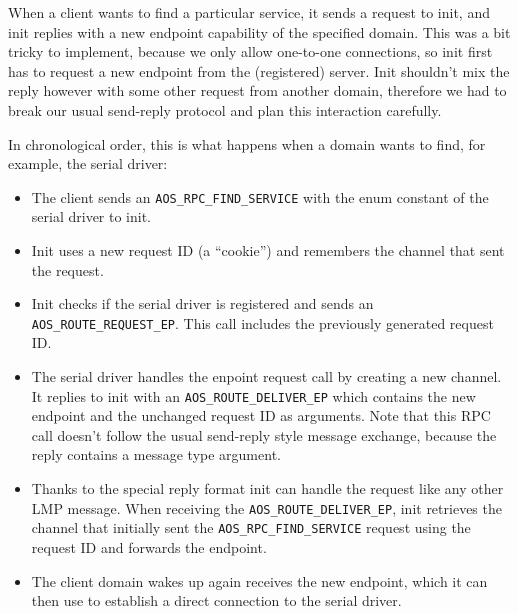 \documentclass[a4paper,10pt]{article}
\begin{document}
When a client wants to find a particular service, it sends a request to init, and init replies with a new endpoint capability of the specified domain.
This was a bit tricky to implement, because we only allow one-to-one connections, so init first has to request a new endpoint from the (registered) server.
Init shouldn't mix the reply however with some other request from another domain, therefore we had to break our usual send-reply protocol and plan this interaction carefully.

In chronological order, this is what happens when a domain wants to find, for example, the serial driver:

\begin{itemize}
 \item The client sends an \lstinline!AOS_RPC_FIND_SERVICE! with the enum constant of the serial driver to init.
 \item Init uses a new request ID (a ``cookie'') and remembers the channel that sent the request.
 \item Init checks if the serial driver is registered and sends an \lstinline!AOS_ROUTE_REQUEST_EP!.
 This call includes the previously generated request ID.
 \item The serial driver handles the enpoint request call by creating a new channel.
 It replies to init with an \lstinline!AOS_ROUTE_DELIVER_EP! which contains the new endpoint and the unchanged request ID as arguments.
 Note that this RPC call doesn't follow the usual send-reply style message exchange, because the reply contains a message type argument.
 \item Thanks to the special reply format init can handle the request like any other LMP message.
 When receiving the \lstinline!AOS_ROUTE_DELIVER_EP!, init retrieves the channel that initially sent the \lstinline!AOS_RPC_FIND_SERVICE! request using the request ID and forwards the endpoint.
 \item The client domain wakes up again receives the new endpoint, which it can then use to establish a direct connection to the serial driver.
\end{itemize}


\end{document}
